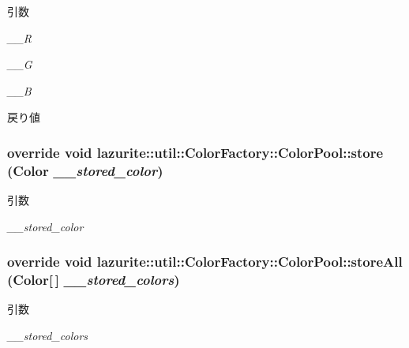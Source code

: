 \begin{DoxyParams}{引数}
\item[{\em \_\-\_\-R}]\item[{\em \_\-\_\-G}]\item[{\em \_\-\_\-B}]\end{DoxyParams}
\begin{DoxyReturn}{戻り値}

\end{DoxyReturn}
\hypertarget{classlazurite_1_1util_1_1_color_factory_1_1_color_pool_a6b5091afd3c6a7e5b5446e409bf32545}{
\subsubsection[{store}]{\setlength{\rightskip}{0pt plus 5cm}override void lazurite::util::ColorFactory::ColorPool::store (Color {\em \_\-\_\-stored\_\-color})}}
\label{classlazurite_1_1util_1_1_color_factory_1_1_color_pool_a6b5091afd3c6a7e5b5446e409bf32545}

\begin{DoxyParams}{引数}
\item[{\em \_\-\_\-stored\_\-color}]\end{DoxyParams}
\hypertarget{classlazurite_1_1util_1_1_color_factory_1_1_color_pool_a638b1ec4359510df77b264c30184105e}{
\subsubsection[{storeAll}]{\setlength{\rightskip}{0pt plus 5cm}override void lazurite::util::ColorFactory::ColorPool::storeAll (Color\mbox{[}$\,$\mbox{]} {\em \_\-\_\-stored\_\-colors})}}
\label{classlazurite_1_1util_1_1_color_factory_1_1_color_pool_a638b1ec4359510df77b264c30184105e}

\begin{DoxyParams}{引数}
\item[{\em \_\-\_\-stored\_\-colors}]\end{DoxyParams}


